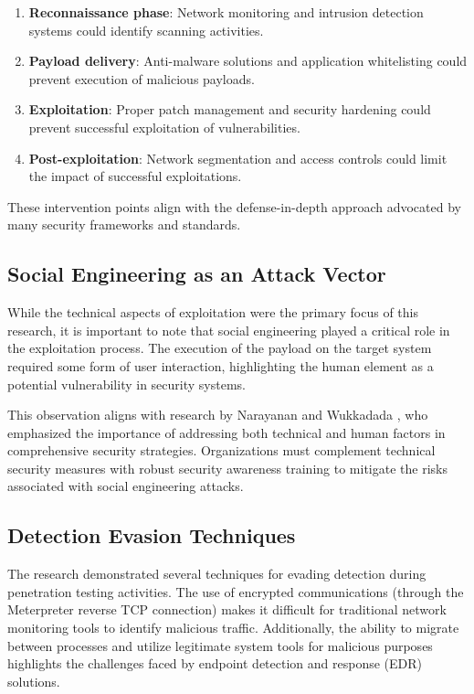 \documentclass[journal,twoside]{IEEEtran}
\begin{document}
\begin{enumerate}
    \item \textbf{Reconnaissance phase}: Network monitoring and intrusion detection systems could identify scanning activities.
    \item \textbf{Payload delivery}: Anti-malware solutions and application whitelisting could prevent execution of malicious payloads.
    \item \textbf{Exploitation}: Proper patch management and security hardening could prevent successful exploitation of vulnerabilities.
    \item \textbf{Post-exploitation}: Network segmentation and access controls could limit the impact of successful exploitations.
\end{enumerate}

These intervention points align with the defense-in-depth approach advocated by many security frameworks and standards.

\subsection{Social Engineering as an Attack Vector}
While the technical aspects of exploitation were the primary focus of this research, it is important to note that social engineering played a critical role in the exploitation process. The execution of the payload on the target system required some form of user interaction, highlighting the human element as a potential vulnerability in security systems.

This observation aligns with research by Narayanan and Wukkadada \cite{narayanan2021}, who emphasized the importance of addressing both technical and human factors in comprehensive security strategies. Organizations must complement technical security measures with robust security awareness training to mitigate the risks associated with social engineering attacks.

\subsection{Detection Evasion Techniques}
The research demonstrated several techniques for evading detection during penetration testing activities. The use of encrypted communications (through the Meterpreter reverse TCP connection) makes it difficult for traditional network monitoring tools to identify malicious traffic. Additionally, the ability to migrate between processes and utilize legitimate system tools for malicious purposes highlights the challenges faced by endpoint detection and response (EDR) solutions.
\end{document}
